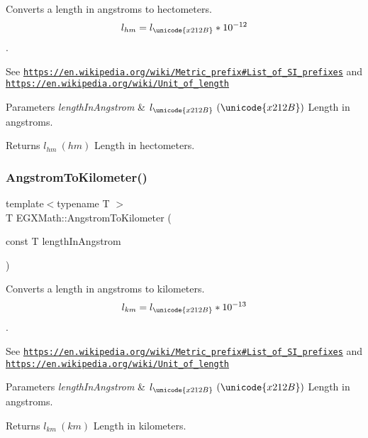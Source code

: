 Converts a length in angstroms to hectometers. \[ l_{hm}=l_{\unicode{x212B}} * 10^{-12} \]. 

See \href{https://en.wikipedia.org/wiki/Metric_prefix#List_of_SI_prefixes}{\tt https\+://en.\+wikipedia.\+org/wiki/\+Metric\+\_\+prefix\#\+List\+\_\+of\+\_\+\+S\+I\+\_\+prefixes} and \href{https://en.wikipedia.org/wiki/Unit_of_length}{\tt https\+://en.\+wikipedia.\+org/wiki/\+Unit\+\_\+of\+\_\+length} 
\begin{DoxyParams}{Parameters}
{\em length\+In\+Angstrom} & $ l_{\unicode{x212B}}\ (\unicode{x212B})$ Length in angstroms. \\
\hline
\end{DoxyParams}
\begin{DoxyReturn}{Returns}
$ l_{hm}\ (hm)$ Length in hectometers. 
\end{DoxyReturn}
\mbox{\label{group___e_g_x_math-_conversions-_length_conversions-_non-_s_i-_angstrom-_s_i_gaff245672bc645b3b4a1d181669a3631e}} 
\subsubsection{\texorpdfstring{Angstrom\+To\+Kilometer()}{AngstromToKilometer()}}
{\footnotesize\ttfamily template$<$typename T $>$ \\
T E\+G\+X\+Math\+::\+Angstrom\+To\+Kilometer (\begin{DoxyParamCaption}\item[{const T}]{length\+In\+Angstrom }\end{DoxyParamCaption})}



Converts a length in angstroms to kilometers. \[ l_{km}=l_{\unicode{x212B}} * 10^{-13} \]. 

See \href{https://en.wikipedia.org/wiki/Metric_prefix#List_of_SI_prefixes}{\tt https\+://en.\+wikipedia.\+org/wiki/\+Metric\+\_\+prefix\#\+List\+\_\+of\+\_\+\+S\+I\+\_\+prefixes} and \href{https://en.wikipedia.org/wiki/Unit_of_length}{\tt https\+://en.\+wikipedia.\+org/wiki/\+Unit\+\_\+of\+\_\+length} 
\begin{DoxyParams}{Parameters}
{\em length\+In\+Angstrom} & $ l_{\unicode{x212B}}\ (\unicode{x212B})$ Length in angstroms. \\
\hline
\end{DoxyParams}
\begin{DoxyReturn}{Returns}
$ l_{km}\ (km)$ Length in kilometers. 
\end{DoxyReturn}
\mbox{\label{group___e_g_x_math-_conversions-_length_conversions-_non-_s_i-_angstrom-_s_i_gae00a8e1d268242cc622c91e84f06f442}} 
